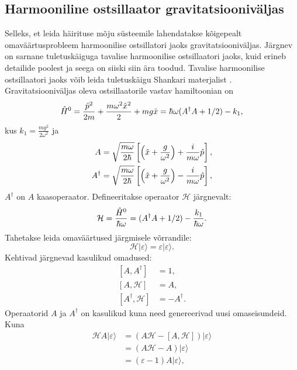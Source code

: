 \documentclass{trkut}%
\renewcommand\ket[1]{{|{#1}\rangle}}
\begin{document}
\subsection{Harmooniline ostsillaator gravitatsiooniväljas}

Selleks, et leida häirituse mõju süsteemile lahendatakse kõigepealt omaväärtusprobleem harmoonilise ostsillatori jaoks gravitatsiooniväljas.
Järgnev on sarnane tuletuskäiguga tavalise harmoonilise ostsillaatori jaoks, kuid erineb detailide poolest ja seega on siiski siin ära toodud.
Tavalise harmoonilise ostsillaatori jaoks võib leida tuletuskäigu Shankari materjalist \parencite[202-216]{shankar94}.
Gravitatsiooniväljas oleva ostsillaatorile vastav hamiltoonian on
\begin{equation}
    \op[0]{H}=\frac{\op{p}^2}{2m}+\frac{m\omega^2 \op{x}^2}{2} + mg\op{x}=\hbar \omega (A^\dagger A + 1/2)-k_1,
\end{equation}
kus $k_1=\frac{mg^2}{2\omega^2}$ ja
\begin{align}
    \begin{split}
        A &= \sqrt{\frac{m\omega}{2\hbar}}\left[ \left( \op{x} + \frac{g}{\omega^2} \right) + \frac{i}{m\omega} \op{p} \right], \\
        A^\dagger &= \sqrt{\frac{m\omega}{2\hbar}}\left[ \left( \op{x} + \frac{g}{\omega^2} \right) - \frac{i}{m\omega} \op{p} \right],
    \end{split}
\end{align}
$A^\dagger$ on $A$ kaasoperaator.
Defineeritakse operaator $\mathcal{H}$ järgnevalt:
\begin{equation}
    \mathcal{H} = \frac{\op[0]{H}}{\hbar \omega}=(A^\dagger A + 1/2)-\frac{k_1}{\hbar \omega}.
    \label{mathcalH}
\end{equation}
Tahetakse leida omaväärtused järgmisele võrrandile:
\begin{equation}
    \mathcal{H}\ket{\varepsilon}=\varepsilon \ket{\varepsilon}.
\end{equation}
Kehtivad järgnevad kasulikud omadused:
\begin{align}
    \left[A, A^\dagger\right] &= 1, \\
    \left[A, \mathcal{H}\right] &=A, \\
    \left[A^\dagger, \mathcal{H}\right] &= -A^\dagger.
\end{align}
Operaatorid $A$ ja $A^\dagger$ on kasulikud kuna need genereerivad uusi omaseisundeid. Kuna
\begin{align}
        \mathcal{H}A\ket{\varepsilon}&=\left(A\mathcal{H}-[A, \mathcal{H}]\right)\ket{\varepsilon} \nonumber\\
        &=(A\mathcal{H}-A)\ket{\varepsilon} \nonumber\\
        &=(\varepsilon - 1)A\ket{\varepsilon},
\end{align}
\end{document}
